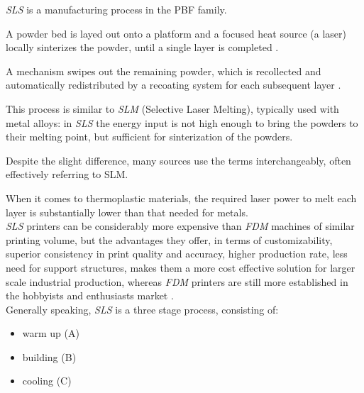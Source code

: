 \documentclass{article}
\begin{document}
    \textit{SLS} is a manufacturing process in the PBF family. 

    A powder bed is layed out onto a platform and a focused heat source (a laser) locally sinterizes the powder, 
    until a single layer is completed \autocites*{Recent_progress_polymers_AM}{Kovalcik_PHA_Review}. 

    A mechanism swipes out the remaining powder, which is recollected and automatically redistributed by a recoating 
    system for each subsequent layer \autocite*{Padovano_SLS_Review}. 

    This process is similar to \textit{SLM} (Selective Laser Melting), typically used with metal alloys: in \textit{SLS} the energy input is not high enough 
    to bring the powders to their melting point, but sufficient for sinterization of the powders. 

    Despite the slight difference, many sources use the terms interchangeably, often effectively referring to SLM. 
    
    When it comes to thermoplastic materials, the required laser power to melt each layer is substantially lower than that needed for metals. \\ 

    \textit{SLS} printers can be considerably more expensive than \textit{FDM} machines of similar printing volume, but the advantages they offer, 
    in terms of customizability, superior consistency in print quality and accuracy, higher production rate, less need for support structures, 
    makes them a more cost effective solution for larger scale industrial production, whereas \textit{FDM} printers are still more established 
    in the hobbyists and enthusiasts market \autocite*{Padovano_SLS_Review}. \\ 

    Generally speaking, \textit{SLS} is a three stage process, consisting of: 
    
    \begin{itemize}
        \item warm up (A)
        \item building (B)
        \item cooling (C)
    \end{itemize}
\end{document}
